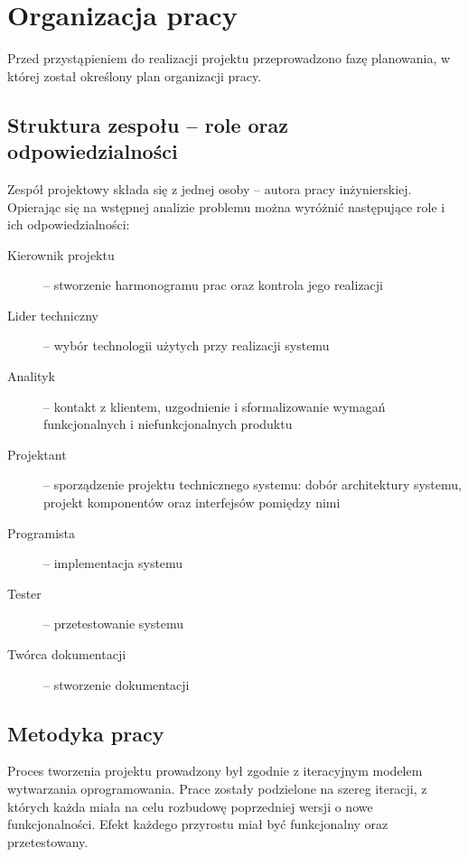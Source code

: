 \section{Organizacja pracy}
\label{sec:organizacja-pracy}

Przed przystąpieniem do realizacji projektu przeprowadzono fazę planowania, w której został określony plan organizacji pracy.

\subsection{Struktura zespołu -- role oraz odpowiedzialności}
Zespół projektowy składa się z jednej osoby -- autora pracy inżynierskiej. Opierając się na wstępnej analizie problemu można wyróżnić następujące role i ich odpowiedzialności:
\begin{description}
\item[Kierownik projektu] -- stworzenie harmonogramu prac oraz kontrola jego realizacji
\item[Lider techniczny] -- wybór technologii użytych przy realizacji systemu
\item[Analityk] -- kontakt z klientem, uzgodnienie i sformalizowanie wymagań funkcjonalnych i niefunkcjonalnych produktu
\item[Projektant] -- sporządzenie projektu technicznego systemu: dobór architektury systemu, projekt komponentów oraz interfejsów pomiędzy nimi
\item[Programista] -- implementacja systemu
\item[Tester] -- przetestowanie systemu
\item[Twórca dokumentacji] -- stworzenie dokumentacji
\end{description}

\subsection{Metodyka pracy}
Proces tworzenia projektu prowadzony był zgodnie z iteracyjnym modelem wytwarzania oprogramowania. Prace zostały podzielone na szereg iteracji, z których każda miała na celu rozbudowę poprzedniej wersji o nowe funkcjonalności. Efekt każdego przyrostu miał być funkcjonalny oraz przetestowany.


